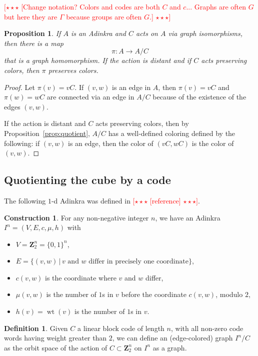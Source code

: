 \documentclass[12pt,twoside,singlespace]{article}
\numberwithin{equation}{section}
\newtheorem{prop}[equation]{Proposition}
\theoremstyle{definition}
\newtheorem{definition}[equation]{Definition}
\newtheorem{construction}[equation]{Construction}
\newcommand{\ZZ}{\mathbf{Z}}
\newcommand{\on}{\operatorname}
\newcommand{\wt}{\on{wt}}
\newcommand{\com}[1]{\textcolor{red}{$[\star \star \star$ #1 $\star \star \star]$}}
\begin{document}
\com{[Change notation?  Colors and codes are both $C$ and $c$...  Graphs are often $G$ but here they are $\Gamma$ because groups are often $G$.]}

\begin{prop}
If $A$ is an Adinkra and $C$ acts on $A$ via graph isomorphisms, then there is a map
\[\pi:A\to A/C\]
 that is a graph homomorphism.  If the action is distant and if $C$ acts preserving colors, then $\pi$ preserves colors.
\end{prop}
\begin{proof}
Let $\pi(v)=vC$.  If $(v,w)$ is an edge in $A$, then $\pi(v)=vC$ and $\pi(w)=wC$ are connected via an edge in $A/C$ because of the existence of the edges $(v,w)$.

If the action is distant and $C$ acts preserving colors, then by Proposition~\ref{prop:quotient}, $A/C$ has a well-defined coloring defined by the following: if $(v,w)$ is an edge, then the color of $(vC,wC)$ is the color of $(v,w)$.
\end{proof}


\subsection{Quotienting the cube by a code}



The following $1$-d Adinkra was defined in \com{[reference]}.
\begin{construction}
For any non-negative integer $n$, we have an Adinkra $I^n=(V,E,c,\mu,h)$ with
\begin{itemize}
\item $V=\ZZ_2^n=\{0,1\}^n$,
\item $E=\{(v,w)\,|\,\mbox{$v$ and $w$ differ in precisely one coordinate}\}$,
\item $c(v,w)$ is the coordinate where $v$ and $w$ differ,
\item $\mu(v,w)$ is the number of $1$s in $v$ before the coordinate $c(v,w)$, modulo $2$,
\item $h(v)=\wt(v)$ is the number of $1$s in $v$.
\end{itemize}
\end{construction}


\begin{definition}
Given $C$ a linear block code of length $n$, with all non-zero code words having weight greater than $2$, we can define an (edge-colored) graph $I^n/C$ as the orbit space of the action of $C\subset \ZZ_2^n$ on $I^n$ as a graph.
\end{definition}
\end{document}
